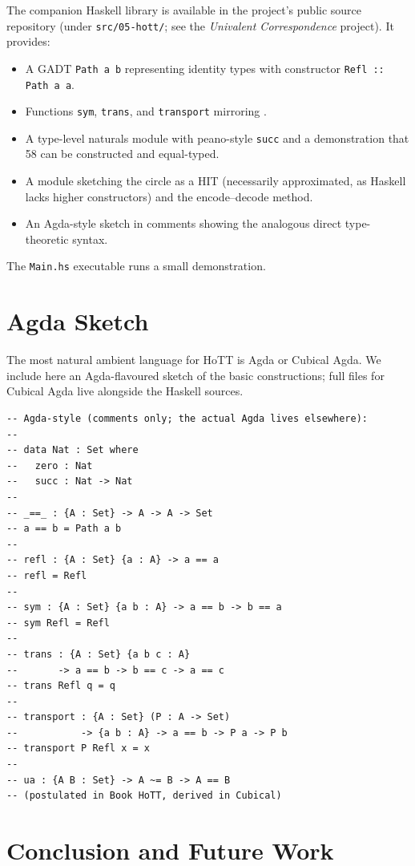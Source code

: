 \documentclass[12pt]{article}
\theoremstyle{definition}
\theoremstyle{remark}
\begin{document}
The companion Haskell library is available in the project's public
source repository (under \texttt{src/05-hott/}; see the
\emph{Univalent Correspondence} project). It provides:
\begin{itemize}
\item A GADT \texttt{Path a b} representing identity types with constructor
\texttt{Refl :: Path a a}.
\item Functions \texttt{sym}, \texttt{trans}, and \texttt{transport}
mirroring .
\item A type-level naturals module with peano-style \texttt{succ} and a
demonstration that 58 can be constructed and equal-typed.
\item A module sketching the circle as a HIT (necessarily approximated, as
Haskell lacks higher constructors) and the encode--decode method.
\item An Agda-style sketch in comments showing the analogous direct
type-theoretic syntax.
\end{itemize}
The \texttt{Main.hs} executable runs a small demonstration.

\section{Agda Sketch}
\label{sec:agda-sketch}

The most natural ambient language for HoTT is Agda or Cubical Agda. We
include here an Agda-flavoured sketch of the basic constructions; full
files for Cubical Agda live alongside the Haskell sources.

\begin{lstlisting}
-- Agda-style (comments only; the actual Agda lives elsewhere):
--
-- data Nat : Set where
--   zero : Nat
--   succ : Nat -> Nat
--
-- _==_ : {A : Set} -> A -> A -> Set
-- a == b = Path a b
--
-- refl : {A : Set} {a : A} -> a == a
-- refl = Refl
--
-- sym : {A : Set} {a b : A} -> a == b -> b == a
-- sym Refl = Refl
--
-- trans : {A : Set} {a b c : A}
--       -> a == b -> b == c -> a == c
-- trans Refl q = q
--
-- transport : {A : Set} (P : A -> Set)
--           -> {a b : A} -> a == b -> P a -> P b
-- transport P Refl x = x
--
-- ua : {A B : Set} -> A ~= B -> A == B
-- (postulated in Book HoTT, derived in Cubical)
\end{lstlisting}

\section{Conclusion and Future Work}
\label{sec:conclusion}
\end{document}
